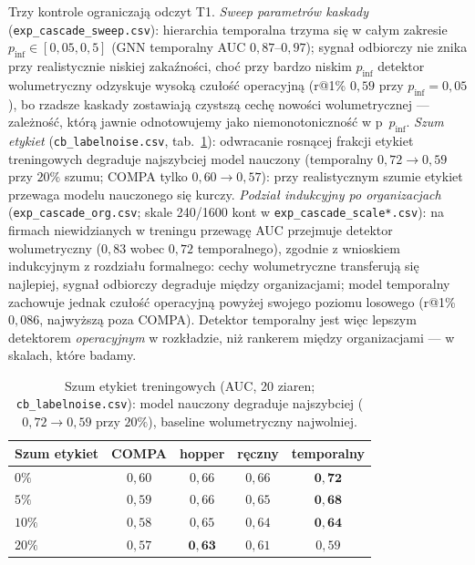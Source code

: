 Trzy kontrole ograniczają odczyt T1. \emph{Sweep parametrów kaskady}
(\texttt{exp\_cascade\_sweep.csv}): hierarchia temporalna trzyma się
w całym zakresie $p_{\mathrm{inf}}\in[0{,}05,0{,}5]$ (GNN temporalny
AUC $0{,}87$--$0{,}97$); sygnał odbiorczy nie znika przy realistycznie
niskiej zakaźności, choć przy bardzo niskim $p_{\mathrm{inf}}$
detektor wolumetryczny odzyskuje wysoką czułość operacyjną
(r@1\% $0{,}59$ przy $p_{\mathrm{inf}}{=}0{,}05$), bo rzadsze
kaskady zostawiają czystszą cechę nowości wolumetrycznej ---
zależność, którą jawnie odnotowujemy jako niemonotoniczność w
p~$p_{\mathrm{inf}}$. \emph{Szum etykiet} (\texttt{cb\_labelnoise.csv},
tab.~\ref{tab:k-noise}): odwracanie rosnącej frakcji etykiet
treningowych degraduje najszybciej model nauczony (temporalny
$0{,}72\to0{,}59$ przy $20\%$ szumu; COMPA tylko $0{,}60\to0{,}57$):
przy realistycznym szumie etykiet przewaga modelu nauczonego się
kurczy. \emph{Podział indukcyjny po organizacjach}
(\texttt{exp\_cascade\_org.csv}; skale 240/1600 kont w
\texttt{exp\_cascade\_scale*.csv}): na firmach niewidzianych
w treningu przewagę AUC przejmuje detektor wolumetryczny
($0{,}83$ wobec $0{,}72$ temporalnego), zgodnie z wnioskiem
indukcyjnym z rozdziału formalnego: cechy wolumetryczne
transferują się najlepiej, sygnał odbiorczy degraduje między
organizacjami; model temporalny zachowuje jednak czułość
operacyjną powyżej swojego poziomu losowego (r@1\% $0{,}086$,
najwyższą poza COMPA). Detektor temporalny jest więc lepszym
detektorem \emph{operacyjnym} w rozkładzie, niż rankerem między
organizacjami --- w skalach, które badamy.

\begin{table}[htbp]\centering
\begin{tabular}{lcccc}
\toprule
Szum etykiet & COMPA & hopper & ręczny & temporalny \\
\midrule
$0\%$   & $0{,}60$ & $0{,}66$ & $0{,}66$ & $\mathbf{0{,}72}$ \\
$5\%$   & $0{,}59$ & $0{,}66$ & $0{,}65$ & $\mathbf{0{,}68}$ \\
$10\%$  & $0{,}58$ & $0{,}65$ & $0{,}64$ & $\mathbf{0{,}64}$ \\
$20\%$  & $0{,}57$ & $\mathbf{0{,}63}$ & $0{,}61$ & $0{,}59$ \\
\bottomrule
\end{tabular}
\caption{Szum etykiet treningowych (AUC, 20 ziaren;
\texttt{cb\_labelnoise.csv}): model nauczony degraduje najszybciej
($0{,}72\to0{,}59$ przy $20\%$), baseline wolumetryczny najwolniej.}
\label{tab:k-noise}
\end{table}

